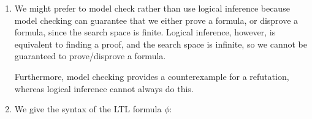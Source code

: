 


\begin{enumerate}[label=(alph*)]

  \item
    We might prefer to model check rather than use logical inference because model checking can guarantee that we either prove a formula, or disprove a formula, since the search space is finite. Logical inference, however, is equivalent to finding a proof, and the search space is infinite, so we cannot be guaranteed to prove/disprove a formula.

    Furthermore, model checking provides a counterexample for a refutation, whereas logical inference cannot always do this.

    \item

      We give the syntax of the LTL formula $\phi$:


        
    \end{enumerate}

